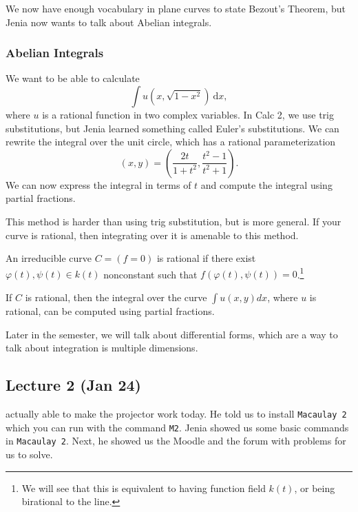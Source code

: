 \documentclass[twoside, 10pt]{article}
\begin{document}
    We now have enough vocabulary in plane curves to state Bezout's Theorem,
    but Jenia now wants to talk about Abelian integrals.

    \subsubsection{Abelian Integrals}

    We want to be able to calculate \[\int u(x,\sqrt{1-x^2})\ \mathrm{d}x,\]
    where $u$ is a rational function in two complex variables. In Calc 2, we
    use trig substitutions, but Jenia learned something called Euler's
    substitutions. We can rewrite the integral over the unit circle, which has
    a rational parameterization \[(x,y) = \left( \frac{2t}{1+t^2},
    \frac{t^2-1}{t^2+1} \right).\] We can now express the integral in terms of
    $t$ and compute the integral using partial fractions.

    This method is harder than using trig substitution, but is more general. If
    your curve is rational, then integrating over it is amenable to this
    method.

    \begin{defn} An irreducible curve $C = (f=0)$ is rational
        if there exist $\varphi(t), \psi(t) \in k(t)$ nonconstant such that
        $f(\varphi(t),\psi(t)) = 0$.\footnote{We will see that this is
            equivalent to having function field $k(t)$, or being birational to
            the line.} \end{defn}

    \begin{cor} If $C$ is rational, then the integral over the curve $\int
    u(x,y) dx$, where $u$ is rational, can be computed using partial fractions.
\end{cor}

    \begin{rmk} Later in the semester, we will talk about differential forms,
    which are a way to talk about integration is multiple dimensions.
\end{rmk}

    \subsection{Lecture 2 (Jan 24)}%
    actually able to make the projector work today. He told us to install
    \texttt{Macaulay 2} which you can run with the command \texttt{M2}.  Jenia
    showed us some basic commands in \texttt{Macaulay 2}. Next, he showed us
    the Moodle and the forum with problems for us to solve.
\end{document}
